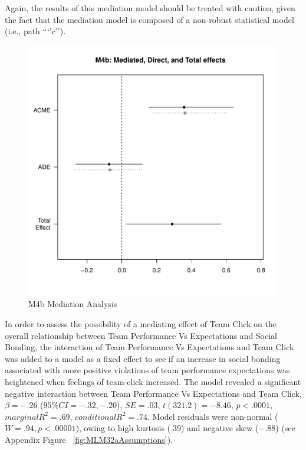 \begin{CJK}{UTF8}{gbsn}
  Again, the results of this mediation model should be treated with caution, given the fact that the mediation model is composed of a non-robust statistical model (i.e., path ```'c'').

  \begin{figure}[htbp]
    \centering
    \includegraphics[scale = .5]{images/MLM4bMediationEffects.pdf}
    \caption{M4b Mediation Analysis}
    \label{fig:MLM4bMediationAnalysis}
  \end{figure}




In order to assess the possibility of a mediating effect of Team Click on the overall relationship between Team Performance Vs Expectations and Social Bonding, the interaction of Team Performance Vs Expectations and Team Click was added to a model as a fixed effect to see if an increase in social bonding associated with more positive violations of team performance expectations was heightened when feelings of team-click increased. The model revealed a significant negative interaction between Team Performance Vs Expectations and Team Click,  $\beta = -.26$ ($95\% CI =  -.32, -.20$), $SE = .03$, $t(321.2) = -8.46$, $p < .0001$, $marginal R^2 = .69$, $conditional R^2 = .74$.  Model residuals were non-normal ($W = .94, p < .00001$), owing to high kurtosis ($.39$) and negative skew ($-.88$) (see Appendix Figure ~\ref{fig:MLM32aAssumptions}).


\end{CJK}
